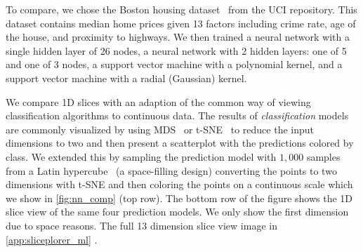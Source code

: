 To compare, we chose the Boston housing dataset~\cite{Lichman:2013} from the
UCI repository. This dataset contains median home prices
given 13 factors including crime rate, age of the house, and proximity to
highways. We then trained a neural network with a single hidden layer of 26
nodes, a neural network with 2 hidden layers: one of 5 and one of 3 nodes, a
support vector machine with a polynomial kernel, and a support vector machine
with a radial (Gaussian) kernel.

We compare 1D slices with an adaption of the common way of viewing
classification algorithms to continuous data.
The results of \emph{classification} models are commonly visualized
by using MDS~\cite{Kruskal:1964} or t-SNE~\cite{Maaten:2008} to reduce the input
dimensions to two and then present a scatterplot with the predictions colored
by class. We extended this by sampling the prediction model with \(1,000\)
samples from a Latin hypercube~\cite{Tang:1993} (a space-filling design)
converting the points to two dimensions with t-SNE and then coloring the points
on a continuous scale which we show in \autoref{fig:nn_comp} (top row).  The
bottom row of the figure shows the 1D slice view of the same four prediction
models. We only show the first dimension due to space reasons. The full 13
dimension slice view image in \autoref{app:sliceplorer_ml} 
.

